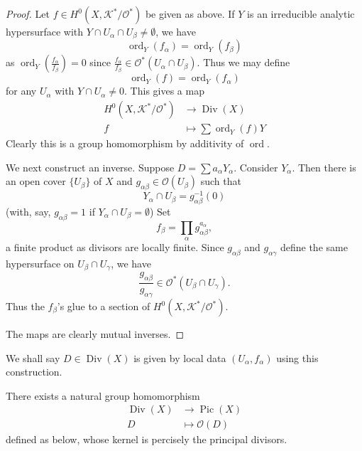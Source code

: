 \documentclass[a4paper]{article}
\DeclareMathOperator{\Pic}{Pic} %
\DeclareMathOperator{\ord}{ord} %
\DeclareMathOperator{\Div}{Div} %
\begin{document}
\begin{proof}
  Let \(f \in H^0(X, \mathcal K^*/\mathcal O^*)\) be given as above. If \(Y\) is an irreducible analytic hypersurface with \(Y \cap U_\alpha \cap U_\beta \neq \emptyset\), we have
  \[
    \ord_Y(f_\alpha) = \ord_Y(f_\beta)
  \]
  as \(\ord_Y(\frac{f_\alpha}{f_\beta}) = 0\) since \(\frac{f_\alpha}{f_\beta} \in \mathcal O^*(U_\alpha \cap U_\beta)\). Thus we may define
  \[
    \ord_Y(f) = \ord_Y(f_\alpha)
  \]
  for any \(U_\alpha\) with \(Y \cap U_\alpha \neq 0\). This gives a map
  \begin{align*}
    H^0(X, \mathcal K^*/\mathcal O^*) &\to \Div(X) \\
    f &\mapsto \sum \ord_Y(f) Y
  \end{align*}
  Clearly this is a group homomorphism by additivity of \(\ord\).

  We next construct an inverse. Suppose \(D = \sum a_\alpha Y_\alpha\). Consider \(Y_\alpha\). Then there is an open cover \(\{U_\beta\}\) of \(X\) and \(g_{\alpha\beta} \in \mathcal O(U_\beta)\) such that
  \[
    Y_\alpha \cap U_\beta = g_{\alpha\beta}^{-1}(0)
  \]
  (with, say, \(g_{\alpha\beta} = 1\) if \(Y_\alpha \cap U_\beta = \emptyset\)) Set
  \[
    f_\beta = \prod_\alpha g_{\alpha\beta}^{a_\alpha},
  \]
  a finite product as divisors are locally finite. Since \(g_{\alpha\beta}\) and \(g_{\alpha\gamma}\) define the same hypersurface on \(U_\beta \cap U_\gamma\), we have
  \[
    \frac{g_{\alpha\beta}}{g_{\alpha\gamma}} \in \mathcal O^*(U_\beta \cap U_\gamma).
  \]
  Thus the \(f_\beta\)'s glue to a section of \(H^0(X, \mathcal K^*/\mathcal O^*)\).

  The maps are clearly mutual inverses.
\end{proof}

We shall say \(D \in \Div(X)\) is given by local data \((U_\alpha, f_\alpha)\) using this construction.

\begin{theorem}
  There exists a natural group homomorphism
  \begin{align*}
    \Div(X) &\to \Pic(X) \\
    D &\mapsto \mathcal O(D)
  \end{align*}
  defined as below, whose kernel is percisely the principal divisors.
\end{theorem}
\end{document}
